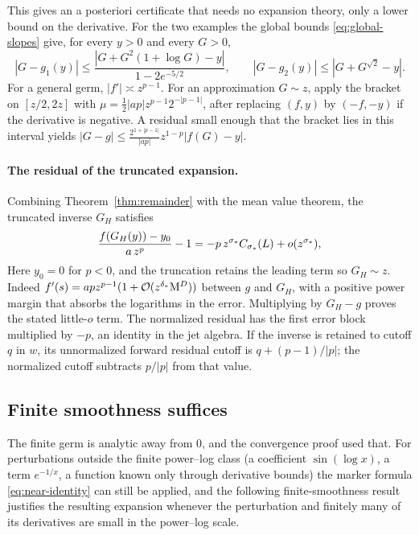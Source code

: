 This gives an a posteriori certificate that needs no expansion theory, only a lower bound on the derivative. For the two examples the global bounds \eqref{eq:global-slopes} give, for every $y>0$ and every $G>0$,
\begin{equation}
 |G-g_1(y)|\le\frac{|G+G^2(1+\log G)-y|}{1-2e^{-5/2}},\qquad |G-g_2(y)|\le|G+G^{\sqrt2}-y| .
 \label{eq:certificates}
\end{equation}
For a general germ, $|f'|\asymp z^{p-1}$. For an approximation $G\sim z$, apply the bracket on $[z/2,2z]$ with $\mu=\frac12|ap|z^{p-1}2^{-|p-1|}$, after replacing $(f,y)$ by $(-f,-y)$ if the derivative is negative. A residual small enough that the bracket lies in this interval yields $|G-g|\le\frac{2^{1+|p-1|}}{|ap|}z^{1-p}|f(G)-y|$.

\paragraph{The residual of the truncated expansion.} Combining Theorem~\ref{thm:remainder} with the mean value theorem, the truncated inverse $G_H$ satisfies
\begin{equation}
 \frac{f(G_H(y))-y_0}{a\,z^p}-1=-p\,z^{\sigma_*}C_{\sigma_*}(L)+o(z^{\sigma_*}),
 \label{eq:residual-identity}
\end{equation}
Here $y_0=0$ for $p<0$, and the truncation retains the leading term so $G_H\sim z$. Indeed $f'(s)=apz^{p-1}(1+\mathcal O(z^{\delta_*}\mathrm M^D))$ between $g$ and $G_H$, with a positive power margin that absorbs the logarithms in the error. Multiplying by $G_H-g$ proves the stated little-$o$ term. The normalized residual has the first error block multiplied by $-p$, an identity in the jet algebra. If the inverse is retained to cutoff $q$ in $w$, its unnormalized forward residual cutoff is $q+(p-1)/|p|$; the normalized cutoff subtracts $p/|p|$ from that value.

\subsection{Finite smoothness suffices}

The finite germ is analytic away from $0$, and the convergence proof used that. For perturbations outside the finite power--log class (a coefficient $\sin(\log x)$, a term $e^{-1/x}$, a function known only through derivative bounds) the marker formula \eqref{eq:near-identity} can still be applied, and the following finite-smoothness result justifies the resulting expansion whenever the perturbation and finitely many of its derivatives are small in the power--log scale.


